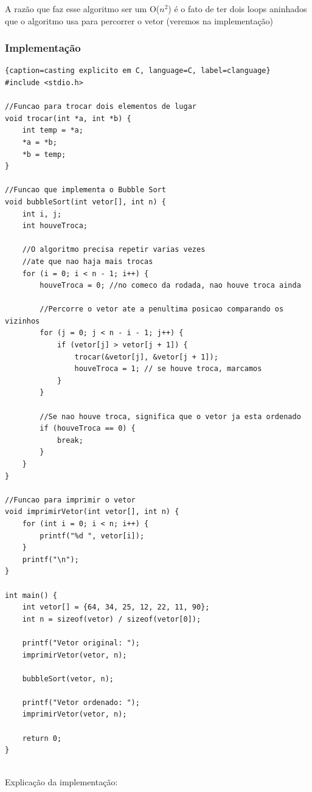 \documentclass{report}
\begin{document}
	A razão que faz esse algoritmo ser um O($n^{2}$) é o fato de ter dois loops aninhados que o algoritmo usa para percorrer o vetor (veremos na implementação)
	
	
	\subsubsection{Implementação}
	
	\begin{center}
		
		\begin{lstlisting}{caption=casting explicito em C, language=C, label=clanguage}
#include <stdio.h>
	
//Funcao para trocar dois elementos de lugar
void trocar(int *a, int *b) {
	int temp = *a;
	*a = *b;
	*b = temp;
}
	
//Funcao que implementa o Bubble Sort
void bubbleSort(int vetor[], int n) {
	int i, j;
	int houveTroca;
		
	//O algoritmo precisa repetir varias vezes
	//ate que nao haja mais trocas
	for (i = 0; i < n - 1; i++) {
		houveTroca = 0; //no comeco da rodada, nao houve troca ainda
			
		//Percorre o vetor ate a penultima posicao comparando os vizinhos
		for (j = 0; j < n - i - 1; j++) {
			if (vetor[j] > vetor[j + 1]) {
				trocar(&vetor[j], &vetor[j + 1]);
				houveTroca = 1; // se houve troca, marcamos
			}
		}
			
		//Se nao houve troca, significa que o vetor ja esta ordenado
		if (houveTroca == 0) {
			break;
		}
	}
}
	
//Funcao para imprimir o vetor
void imprimirVetor(int vetor[], int n) {
	for (int i = 0; i < n; i++) {
		printf("%d ", vetor[i]);
	}
	printf("\n");
}
	
int main() {
	int vetor[] = {64, 34, 25, 12, 22, 11, 90};
	int n = sizeof(vetor) / sizeof(vetor[0]);
		
	printf("Vetor original: ");
	imprimirVetor(vetor, n);
		
	bubbleSort(vetor, n);
		
	printf("Vetor ordenado: ");
	imprimirVetor(vetor, n);
		
	return 0;
}
				
		\end{lstlisting}
	\end{center}
	
	Explicação da implementação:
	
\end{document}
